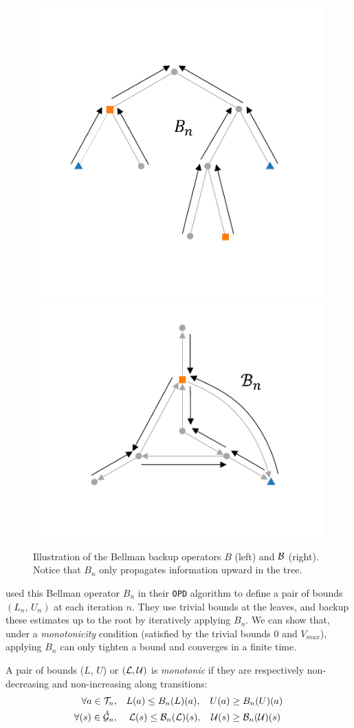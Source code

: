 \begin{figure}[tp]
	\centering
	\includegraphics[trim={2.0cm 2.9cm 2.5cm 3.1cm}, clip,width=0.44\linewidth]{img/gbop/tree_2}
	\hfill
	\includegraphics[trim={2.7cm 2.7cm 2.7cm 1.1cm}, clip,width=0.44\linewidth]{img/gbop/graph_2}
	\caption{Illustration of the Bellman backup operators $B$ (left) and $\mathcal{B}$ (right). Notice that $B_n$ only propagates information upward in the tree.}
	\label{fig:bellman}
\end{figure}

\citet{Hren2008optimistic} used this Bellman operator $B_n$ in their \texttt{OPD} algorithm to define a pair of bounds $(L_n,\, U_n)$ at each iteration $n$. They use trivial bounds at the leaves, and backup these estimates up to the root by iteratively applying $B_n$. We can show that, under a \textit{monotonicity} condition (satisfied by the trivial bounds $0$ and $V_{max}$), applying $B_n$ can only tighten a bound and converges in a finite time.

\begin{definition}[Monotonicity]
	\begin{leftbar}[defnbar]
	A pair of bounds ($L$, $U$) or $(\mathcal{L}, \mathcal{U})$ is \emph{monotonic} if they are respectively non-decreasing and non-increasing along transitions:
	\begin{align*}
	\forall a\in{\mathcal{T}}_n, \quad & L(a) \leq B_n(L)(a), & U(a) & \geq B_n(U)(a)\\
	\forall (s)\in\mathring{\mathcal{G}}_n, \quad &\; \mathcal{L}(s) \leq \mathcal{B}_n(\mathcal{L})(s),&   \mathcal{U}(s) & \geq \mathcal{B}_n(\mathcal{U})(s)
	\end{align*}
	\end{leftbar}
\end{definition}

